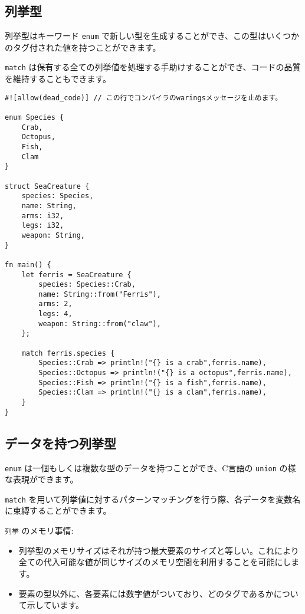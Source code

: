 \subsection{列挙型}

列挙型はキーワード \texttt{enum}
で新しい型を生成することができ、この型はいくつかのタグ付された値を持つことができます。

\texttt{match}
は保有する全ての列挙値を処理する手助けすることができ、コードの品質を維持することもできます。

\begin{verbatim}
#![allow(dead_code)] // この行でコンパイラのwaringsメッセージを止めます。

enum Species {
    Crab,
    Octopus,
    Fish,
    Clam
}

struct SeaCreature {
    species: Species,
    name: String,
    arms: i32,
    legs: i32,
    weapon: String,
}

fn main() {
    let ferris = SeaCreature {
        species: Species::Crab,
        name: String::from("Ferris"),
        arms: 2,
        legs: 4,
        weapon: String::from("claw"),
    };

    match ferris.species {
        Species::Crab => println!("{} is a crab",ferris.name),
        Species::Octopus => println!("{} is a octopus",ferris.name),
        Species::Fish => println!("{} is a fish",ferris.name),
        Species::Clam => println!("{} is a clam",ferris.name),
    }
}
\end{verbatim}

\subsection{データを持つ列挙型}

\texttt{enum} は一個もしくは複数な型のデータを持つことができ、C言語の
\texttt{union} の様な表現ができます。

\texttt{match}
を用いて列挙値に対するパターンマッチングを行う際、各データを変数名に束縛することができます。

\texttt{列挙} のメモリ事情:

\begin{itemize}
\item
  列挙型のメモリサイズはそれが持つ最大要素のサイズと等しい。これにより全ての代入可能な値が同じサイズのメモリ空間を利用することを可能にします。
\item
  要素の型以外に、各要素には数字値がついており、どのタグであるかについて示しています。
\end{itemize}

